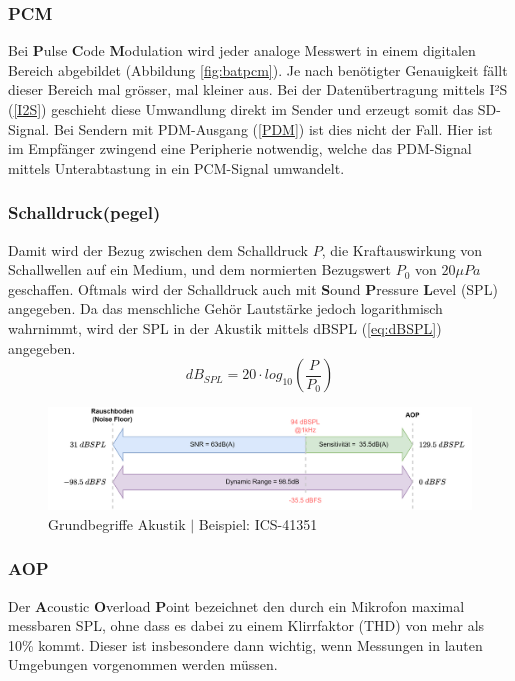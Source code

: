 \documentclass[12pt]{article}
\begin{document}
	\subsubsection*{PCM}
	Bei \textbf{P}ulse \textbf{C}ode \textbf{M}odulation wird jeder analoge Messwert in einem digitalen Bereich abgebildet (Abbildung \ref{fig:batpcm}). Je nach benötigter Genauigkeit fällt dieser Bereich mal grösser, mal kleiner aus. Bei der Datenübertragung mittels I²S (\ref{I2S}) geschieht diese Umwandlung direkt im Sender und erzeugt somit das SD-Signal. Bei Sendern mit PDM-Ausgang (\ref{PDM}) ist dies nicht der Fall. Hier ist im Empfänger zwingend eine Peripherie notwendig, welche das PDM-Signal mittels Unterabtastung in ein PCM-Signal umwandelt.
	\subsubsection*{Schalldruck(pegel)}
	Damit wird der Bezug zwischen dem Schalldruck \textbf{$P$}, die Kraftauswirkung von Schallwellen auf ein Medium, und dem normierten Bezugswert \textbf{$P_0$} von $20 \mu Pa$ geschaffen. Oftmals wird der Schalldruck auch mit \textbf{S}ound \textbf{P}ressure \textbf{L}evel (SPL) angegeben. Da das menschliche Gehör Lautstärke jedoch logarithmisch wahrnimmt, wird der SPL in der Akustik mittels dBSPL (\ref{eq:dBSPL}) angegeben.
	\begin{equation}\label{eq:dBSPL}
		dB_{SPL} = 20 \cdot log_{10}(\frac{P}{P_0})
	\end{equation}
	\begin{figure}[H]
		\centering
		\includegraphics[width=\linewidth]{images/BAT_PDM_Grundbegriffe}
		\caption{Grundbegriffe Akustik $\vert$ Beispiel: ICS-41351}
		\label{fig:batpdmgrundbegriffe}
	\end{figure}
	\subsubsection*{AOP} \label{AOP}
	Der \textbf{A}coustic \textbf{O}verload \textbf{P}oint bezeichnet den durch ein Mikrofon maximal messbaren SPL, ohne dass es dabei zu einem Klirrfaktor (THD) von mehr als 10\% kommt. Dieser ist insbesondere dann wichtig, wenn Messungen in lauten Umgebungen vorgenommen werden müssen.
\end{document}
